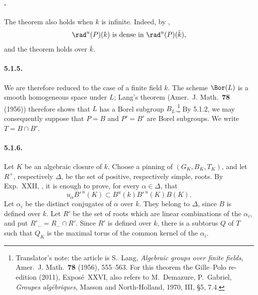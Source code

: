 \paragraph{.}
The theorem also holds when \(k\) is infinite.  Indeed, by ,
\[
 \rad^u(P)(k)\ \text{is dense in}\ \rad^u(P)(\bar k),
\]
and the theorem holds over \(\bar k\).

\paragraph{5.1.5.}
We are therefore reduced to the case of a finite field \(k\).
The scheme \(\Bor(L)\) is a smooth homogeneous space under \(L\);
Lang's theorem \textup{(Amer.\ J. Math.\ \textbf{78} \textup{(1956)})}
therefore shows that \(L\) has a Borel subgroup \(B_L\).\footnote{Translator's note: the article is S.~Lang, \textit{Algebraic groups
over finite fields}, Amer.\ J. Math.\ \textbf{78} (1956), 555--563. For this
theorem the Gille--Polo re-edition (2011), Exposé~XXVI, also refers to
M.~Demazure, P.~Gabriel, \textit{Groupes algébriques}, Masson and
North-Holland, 1970, III, §5, 7.4.}
By 5.1.2, we may consequently suppose that \(P=B\) and \(P'=B'\)
are Borel subgroups.  We write \(T=B\cap B'\).

\paragraph{5.1.6.}
Let \(K\) be an algebraic closure of \(k\).  Choose a pinning of
\((G_K,B_K,T_K)\), and let \(R^+\), respectively \(\Delta\), be the
set of positive, respectively simple, roots.  By Exp.\ XXII, ,
it is enough to prove, for every \(\alpha\in\Delta\), that
\[
 u_\alpha B'^{\,u}(K)
 \subset B^u(k)B'^{\,u}(K)B(K).                       \tag{1}\label{sga3:xxvi:theorem:5-1:equation:1}
\]
Let \(\alpha_i\) be the distinct conjugates of \(\alpha\) over \(k\).
They belong to \(\Delta\), since \(B\) is defined over \(k\).  Let
\(R'\) be the set of roots which are linear combinations of the
\(\alpha_i\), and put \(R'_- = R_-\cap R'\).  Since \(R'\) is defined
over \(k\), there is a subtorus \(Q\) of \(T\) such that \(Q_K\) is
the maximal torus of the common kernel of the \(\alpha_i\).


